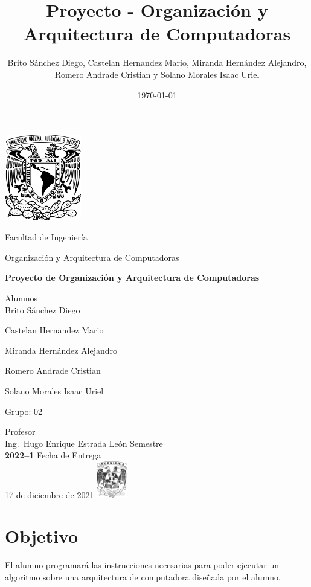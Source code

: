 \documentclass{IEEEtran}
\author{Brito Sánchez Diego, Castelan Hernandez Mario, Miranda Hernández Alejandro, Romero Andrade Cristian y Solano Morales Isaac Uriel}
\date{\today}
\title{Proyecto - Organización y Arquitectura de Computadoras}
\begin{document}
\begin{titlepage}
\centering
\includegraphics[width=0.25\textwidth]{./img_common/unam_logo}\vspace{0.5cm}\\
{\scshape{\Huge Facultad de Ingeniería\par{}}}\vspace{0.25cm}
{\scshape{\Large Organización y Arquitectura de Computadoras\par{}}}\vfill{}
{\huge \textbf{Proyecto de Organización y Arquitectura de Computadoras}}\vfill{}
{\Large Alumnos\\
Brito Sánchez Diego

Castelan Hernandez Mario

Miranda Hernández Alejandro

Romero Andrade Cristian

Solano Morales Isaac Uriel

}\vfill{}
{\large Grupo: 02\par{}}\vfill{}
{\large Profesor\\Ing.~Hugo Enrique Estrada León}\vfill{}
\vfil{}
{\large Semestre\\\textbf{2022--1}}
\vfill{}
{\large Fecha de Entrega\\17 de diciembre de 2021}
\vfill{}
\includegraphics[width=0.1\textwidth]{./img_common/inge_logo}
\end{titlepage}

\maketitle
\tableofcontents

\section{Objetivo}
\label{sec:orgf52bc71}
El alumno programará las instrucciones necesarias para poder ejecutar un algoritmo sobre una arquitectura de computadora  diseñada por el alumno.
\end{document}
